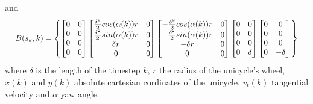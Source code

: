 \documentclass[twocolumn]{article}
\begin{document}
and 
\begin{equation*}%
    \resizebox{.99 \columnwidth}{!}{
    $B(s_{k},k)=\begin{Bmatrix}
        \begin{bmatrix}
            0 & 0 \\
            0          & 0 \\
            0     & 0 \\
            0          & 0 \\
        \end{bmatrix}
        \begin{bmatrix}
            \frac{\delta^{2}}{2} cos(\alpha (k))r & 0 \\
            \frac{\delta^{2}}{2} sin(\alpha (k))r & 0 \\
            \delta r    & 0 \\
            0          & 0 \\
        \end{bmatrix}
        \begin{bmatrix}
            -\frac{\delta^{2}}{2} cos(\alpha (k))r & 0 \\
            -\frac{\delta^{2}}{2} sin(\alpha (k))r & 0 \\
            -\delta r    & 0 \\
            0          & 0 \\
        \end{bmatrix}
        \begin{bmatrix}
            0 & 0          \\
            0 & 0 \\
            0 & 0          \\
            0 & \delta     \\
        \end{bmatrix}
        \begin{bmatrix}
            0 & 0          \\
            0 & 0 \\
            0 & 0          \\
            0 & -\delta     \\
        \end{bmatrix}
    \end{Bmatrix} $ 
    }
\end{equation*}
where $\delta$ is the length of the timestep $k$, $r$ the radius of the unicycle's wheel, $x(k)$ and $y(k)$ absolute cartesian cordinates of the unicycle, 
$v_{t}(k)$ tangential velocity and $\alpha$ yaw angle.
\end{document}
